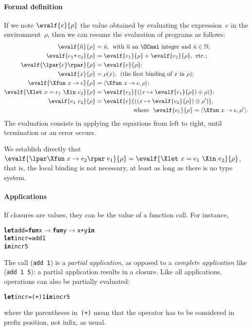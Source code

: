 \paragraph{Formal definition}

If we note \(\evalf{e}{\rho}\) the value obtained by evaluating the
expression~\(e\) in the environment~\(\rho\), then we can resume the
evaluation of \OCaml programs as follows:
\begin{align*}
\evalf{\overline{n}}{\rho} &= \dot{n}, \;\, \text{with
  $\overline{n}$ an \OCaml integer and $\dot{n} \in \mathbb{N}$};\\
\evalf{e_1 \texttt{+} \, e_2}{\rho} &= \evalf{e_1}{\rho} +
\evalf{e_2}{\rho},\;\, \text{etc.};\\
\evalf{\lpar{e}\rpar}{\rho} &= \evalf{e}{\rho};\\
\evalf{x}{\rho} &= \rho(x), \;\, \text{(the first binding of~$x$
  in~$\rho$)};\\
\evalf{\Xfun \,\, x \rightarrow e}{\rho} &= \langle\Xfun \,\, x
\rightarrow e, \rho\rangle;\\
\evalf{\Xlet \,\, x = e_1 \,\, \Xin \,\, e_2}{\rho} &= \evalf{e_2}{((x
  \mapsto \evalf{e_1}{\rho}) \oplus \rho)};\\
\evalf{e_1 \,\, e_2}{\rho} &= \evalf{e}{((x \mapsto \evalf{e_2}{\rho})
  \oplus \rho')},\\
&\phantom{=\llbracket} \textnormal{where} \ \ \evalf{e_1}{\rho} =
\langle\Xfun \,\, x \rightarrow e,\rho'\rangle.
\end{align*}
The evaluation consists in applying the equations from left to right,
until termination or an error occurs.

We establish directly that $\evalf{\lpar\Xfun \; x \rightarrow
  e_2\rpar \; e_1}{\rho} = \evalf{\Xlet \,\, x = e_1 \,\, \Xin \,\,
  e_2}{\rho}$, that is, the local binding is not necessary, at least
  as long as there is no type system.

\paragraph{Applications}

If closures are values, they can be the value of a function call. For
instance,
\begin{alltt}
\textbf{let} add = \textbf{fun} x \(\rightarrow\) \textbf{fun} y \(\rightarrow\) x + y \textbf{in}
  \textbf{let} incr = add 1
\textbf{in} incr 5
\end{alltt}
The call (\texttt{add 1}) is a \emph{partial application}, as opposed
to a \emph{complete application} like (\texttt{add 1 5}): a partial
application results in a closure. Like all applications, operations
can also be partially evaluated:
\begin{alltt}
\textbf{let} incr = (+) 1 \textbf{in} incr 5
\end{alltt}
where the parentheses in~\texttt{(+)} mean that the operator has to be
considered in prefix position, not infix, as usual.

